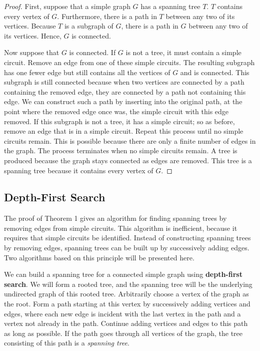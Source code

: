 \documentclass{article}
\begin{document}
\begin{proof}
First, suppose that a simple graph $G$ has a spanning tree $T$. $T$ contains every vertex of $G$. Furthermore, there is a path in $T$ between any two of its vertices. Because $T$ is a subgraph of $G$, there is a path in $G$ between any two of its vertices. Hence, $G$ is connected.

Now suppose that $G$ is connected. If $G$ is not a tree, it must contain a simple circuit. Remove an edge from one of these simple circuits. The resulting subgraph has one fewer edge but still contains all the vertices of $G$ and is connected. This subgraph is still connected because when two vertices are connected by a path containing the removed edge, they are connected by a path not containing this edge. We can construct such a path by inserting into the original path, at the point where the removed edge once was, the simple circuit with this edge removed. If this subgraph is not a tree, it has a simple circuit; so as before, remove an edge that is in a simple circuit. Repeat this process until no simple circuits remain. This is possible because there are only a finite number of edges in the graph. The process terminates when no simple circuits remain. A tree is produced because the graph stays connected as edges are removed. This tree is a spanning tree because it contains every vertex of $G$.
\end{proof}

\subsection{Depth-First Search}

The proof of Theorem 1 gives an algorithm for finding spanning trees by removing edges from simple circuits. This algorithm is inefficient, because it requires that simple circuits be identified. Instead of constructing spanning trees by removing edges, spanning trees can be built up by successively adding edges. Two algorithms based on this principle will be presented here.

We can build a spanning tree for a connected simple graph using \textbf{depth-first search}. We will form a rooted tree, and the spanning tree will be the underlying undirected graph of this rooted tree. Arbitrarily choose a vertex of the graph as the root. Form a path starting at this vertex by successively adding vertices and edges, where each new edge is incident with the last vertex in the path and a vertex not already in the path. Continue adding vertices and edges to this path as long as possible. If the path goes through all vertices of the graph, the tree consisting of this path is a \textit{spanning tree}. 
\end{document}
